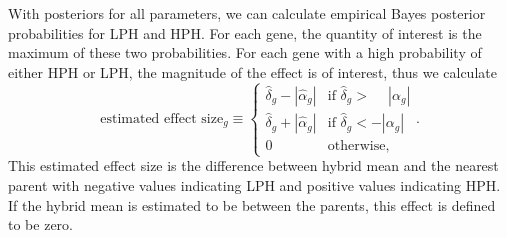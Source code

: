 \documentclass[useAMS,usenatbib,referee]{biom}
\begin{document}
With posteriors for all parameters, we can calculate empirical Bayes posterior probabilities for LPH and HPH. For each gene, the quantity of interest is the maximum of these two probabilities. For each gene with a high probability of either HPH or LPH, the magnitude of the effect is of interest, thus we calculate 
\begin{equation}
\mbox{estimated effect size}_g \equiv \left\{ 
\begin{array}{ll}
\hat{\delta}_g - |\hat{\alpha}_g| & \mbox{if } \hat{\delta}_g > \phantom{-}|\alpha_g| \\
\hat{\delta}_g + |\hat{\alpha}_g| & \mbox{if } \hat{\delta}_g < -|\alpha_g| \\
0 & \mbox{otherwise},
\end{array}.
\right. 
\label{e:effect_size}
\end{equation}
This estimated effect size is the difference between hybrid mean and the nearest parent with negative values indicating LPH and positive values indicating HPH. If the hybrid mean is estimated to be between the parents, this effect is defined to be zero. 
\end{document}
